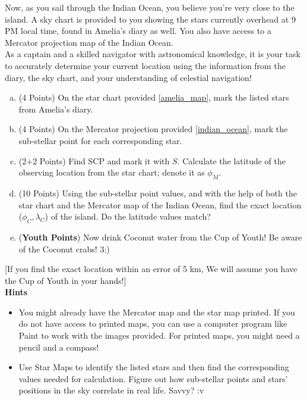 \documentclass[a4paper,12pt]{extarticle}
\begin{document}
{ \footnotesize
Now, as you sail through the Indian Ocean, you believe you're very close to the island. A sky chart is provided to you showing the stars currently overhead at 9 PM local time, found in Amelia's diary as well. You also have access to a Mercator projection map of the Indian Ocean.\\

As a captain and a skilled navigator with astronomical knowledge, it is your task to accurately determine your current location using the information from the diary, the sky chart, and your understanding of celestial navigation!
\begin{enumerate}[a.]
	\item (4 Points) On the star chart provided \ref{amelia_map}, mark the listed stars from Amelia's diary.
	\item (4 Points) On the Mercator projection provided \ref{indian_ocean}, mark the sub-stellar point for each corresponding star. 
	\item (2+2 Points) Find SCP and mark it with $S$. Calculate the latitude of the observing location from the star chart; denote it as $\phi_M$.
	\item (10 Points) Using the sub-stellar point values, and with the help of both the star chart and the Mercator map of the Indian Ocean, find the exact location ($\phi_C, \lambda_C$) of the island. Do the latitude values match?
	\item (\textbf{Youth Points}) Now drink Coconut water from the Cup of Youth! Be aware of the Coconut crabs!  3:) 
\end{enumerate}
[\textsf{If you find the exact location within an error of 5 km, We will assume you have the Cup of Youth in your hands!}]\\

\textbf{Hints}
\begin{itemize}
	\itemsep0em 
	\item You might already have the Mercator map and the star map printed. If you do not have access to printed maps, you can use a computer program like Paint to work with the images provided. For printed maps, you might need a pencil and a compass!
	\item Use Star Maps to identify the listed stars and then find the corresponding values needed for calculation. Figure out how sub-stellar points and stars' positions in the sky correlate in real life. Savvy? :v  
\end{itemize}}

\end{document}

